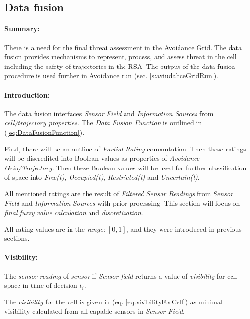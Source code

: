 \subsection{Data fusion}\label{s:sensorFusion}

\paragraph{Summary:} There is a need for the final threat assessment in the Avoidance Grid. The data fusion provides mechanisms to represent, process, and assess threat in the cell including the safety of trajectories in the RSA. The output of the data fusion procedure is used further in Avoidance run (sec. \ref{s:aviudabceGridRun}).


\paragraph{Introduction:} The data fusion interfaces \emph{Sensor Field} and \emph{Information Sources} from \emph{cell/trajectory properties}. The \emph{Data Fusion Function} is outlined in (\ref{eq:DataFusionFunction}). 

First, there will be an outline of \emph{Partial Rating} commutation. Then these ratings will be discredited into Boolean values as properties of \emph{Avoidance Grid/Trajectory}. Then these Boolean values will be used for further classification of  space into \emph{Free(t), Occupied(t), Restricted(t)} and \emph{Uncertain(t)}.

All mentioned ratings are the result of \emph{Filtered Sensor Readings} from \emph{Sensor Field} and \emph{Information Sources} with prior processing. This section will focus on \emph{final fuzzy value calculation} and \emph{discretization}. 
\begin{note}
    All rating values are in the \emph{range:} $[0,1]$, and they were introduced in previous sections.
\end{note}


\paragraph{Visibility:} The \emph{sensor reading} of \emph{sensor} if \emph{Sensor field} returns a value of \emph{visibility} for cell space in time of decision $t_i$.

The \emph{visibility} for the cell is given in (eq. \ref{eq:visibilityForCell}) as minimal visibility calculated from all capable sensors in \emph{Sensor Field}.

